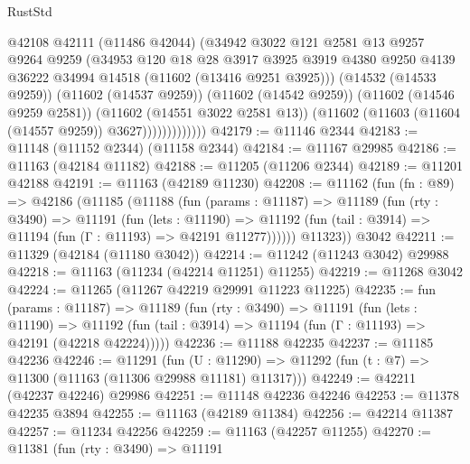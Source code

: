 \begin{lexlean}{RustStd}
\begin{coremodule}
                        @42108
                        @42111
                        (@11486 @42044)
                        (@34942
                          @3022
                          @121
                          @2581
                          @13
                          @9257
                          @9264
                          @9259
                          (@34953
                            @120
                            @18
                            @28
                            @3917
                            @3925
                            @3919
                            @4380
                            @9250
                            @4139
                            @36222
                            @34994
                            @14518
                            (@11602 (@13416 @9251 @3925)))
                          (@14532 (@14533 @9259))
                          (@11602 (@14537 @9259))
                          (@11602 (@14542 @9259))
                          (@11602 (@14546 @9259 @2581))
                          (@11602 (@14551 @3022 @2581 @13))
                          (@11602 (@11603 (@11604 (@14557 @9259)) @3627)))))))))))))
@42179 := @11146 @2344
@42183 := @11148 (@11152 @2344) (@11158 @2344)
@42184 := @11167 @29985
@42186 := @11163 (@42184 @11182)
@42188 := @11205 (@11206 @2344)
@42189 := @11201 @42188
@42191 := @11163 (@42189 @11230)
@42208 := @11162
    (fun (fn : @89) =>
    @42186
      (@11185
        (@11188
          (fun (params : @11187) =>
          @11189
            (fun (rty : @3490) =>
            @11191
              (fun (lets : @11190) =>
              @11192 (fun (tail : @3914) => @11194 (fun (Γ : @11193) => @42191 @11277))))))
        @11323))
    @3042
@42211 := @11329 (@42184 (@11180 @3042))
@42214 := @11242 (@11243 @3042) @29988
@42218 := @11163 (@11234 (@42214 @11251) @11255)
@42219 := @11268 @3042
@42224 := @11265 (@11267 @42219 @29991 @11223 @11225)
@42235 := fun (params : @11187) =>
  @11189
    (fun (rty : @3490) =>
    @11191
      (fun (lets : @11190) =>
      @11192 (fun (tail : @3914) => @11194 (fun (Γ : @11193) => @42191 (@42218 @42224)))))
@42236 := @11188 @42235
@42237 := @11185 @42236
@42246 := @11291
    (fun (U : @11290) => @11292 (fun (t : @7) => @11300 (@11163 (@11306 @29988 @11181) @11317)))
@42249 := @42211 (@42237 @42246) @29986
@42251 := @11148 @42236 @42246
@42253 := @11378 @42235 @3894
@42255 := @11163 (@42189 @11384)
@42256 := @42214 @11387
@42257 := @11234 @42256
@42259 := @11163 (@42257 @11255)
@42270 := @11381
    (fun (rty : @3490) =>
    @11191

\end{coremodule}
\end{lexlean}
